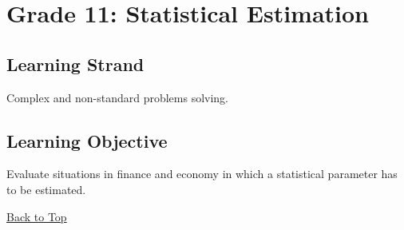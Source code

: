 \section{Grade 11: Statistical Estimation}\label{sec:grade11-term2-overview}

\subsection{Learning Strand}\label{sec:grade11-term2-strand}

Complex and non-standard problems solving.

\subsection{Learning Objective}\label{sec:grade11-term2-objective}

Evaluate situations in finance and economy in which a statistical parameter has to be estimated.

\vspace{6pt}
\noindent\hyperref[table-of-contents]{Back to Top}
